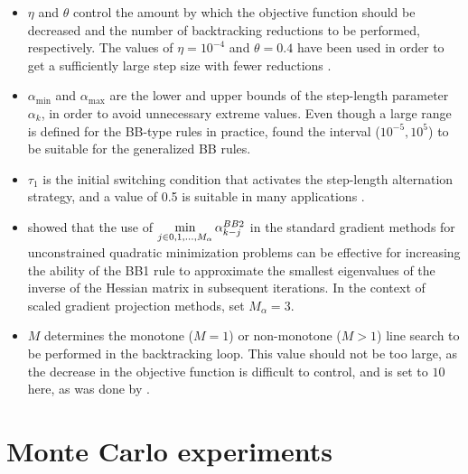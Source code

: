 \documentclass[11pt]{article}
\newcommand{\0}{\phantom{0}}
\newcommand*{\minidx}{\operatornamewithlimits{min}\limits}
\begin{document}
\begin{itemize}
	\item $\eta$ and $\theta$ control the amount by which the objective function should be decreased and the number of backtracking reductions to be performed, respectively. The values of $\eta = 10^{-4}$ and $\theta = 0.4$ have been used in order to get a sufficiently large step size with fewer reductions \citep{Bonettini2009}.
	\item $\alpha_{\text{min}}$ and $\alpha_{\text{max}}$ are the lower and upper bounds of the step-length parameter $\alpha_{k}$, in order to avoid unnecessary extreme values. Even though a large range is defined for the BB-type rules in practice, \citet{Bertero2013} found the interval ($10^{-5}, 10^{5}$) to be suitable for the generalized BB rules.
	\item $\tau_{1}$ is the initial switching condition that activates the step-length alternation strategy, and a value of 0.5 is suitable in many applications \citep{Bonettini2009, Bertero2013}.
	\item \citet{Frassoldati2008} showed that the use of $\minidx\limits_{j \in 0, 1, \dots, M_{\alpha}}\alpha^{BB2}_{k-j}$ in the standard gradient methods for unconstrained quadratic minimization problems can be effective for increasing the ability of the BB1 rule to approximate the smallest eigenvalues of the inverse of the Hessian matrix in subsequent iterations. In the context of scaled gradient projection methods, \citet{Bonettini2009} set $M_{\alpha} = 3$.
	\item $M$ determines the monotone ($M =1$) or non-monotone ($M > 1$) line search to be performed in the backtracking loop. This value should not be too large, as the decrease in the objective function is difficult to control, and is set to $10$ here, as was done by \citet{Bonettini2009}. 
\end{itemize}

\section{Monte Carlo experiments}
\label{sec:MCNN}
\end{document}
